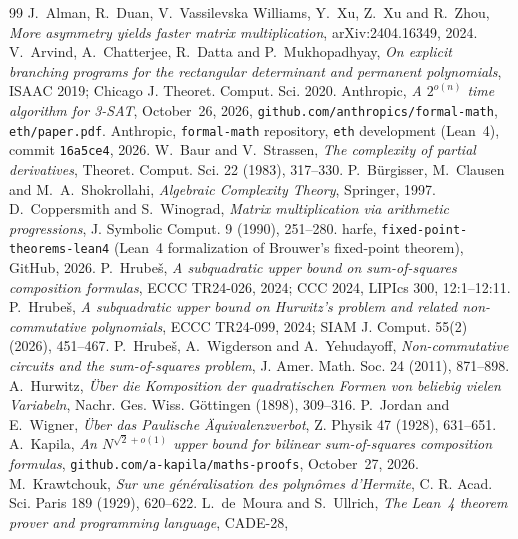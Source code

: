 \documentclass[11pt]{article}
\theoremstyle{definition}
\theoremstyle{remark}
\begin{document}
\begin{thebibliography}{99}
 J.~Alman, R.~Duan, V.~Vassilevska Williams, Y.~Xu, Z.~Xu and R.~Zhou, \emph{More asymmetry
yields faster matrix multiplication}, arXiv:2404.16349, 2024.
 V.~Arvind, A.~Chatterjee, R.~Datta and P.~Mukhopadhyay, \emph{On explicit branching programs
for the rectangular determinant and permanent polynomials}, ISAAC 2019; Chicago J. Theoret. Comput. Sci. 2020.
 Anthropic, \emph{A $2^{o(n)}$ time algorithm for 3-SAT}, October~26, 2026,
\texttt{github.com/anthropics/formal-math}, \texttt{eth/paper.pdf}.
 Anthropic, \texttt{formal-math} repository, \texttt{eth} development (Lean~4),
commit \texttt{16a5ce4}, 2026.
 W.~Baur and V.~Strassen, \emph{The complexity of partial derivatives}, Theoret.
Comput. Sci. 22 (1983), 317--330.
 P.~B\"urgisser, M.~Clausen and M.~A.~Shokrollahi, \emph{Algebraic Complexity Theory}, Springer,
1997.
 D.~Coppersmith and S.~Winograd, \emph{Matrix multiplication via arithmetic
progressions}, J. Symbolic Comput. 9 (1990), 251--280.
 harfe, \texttt{fixed-point-theorems-lean4} (Lean~4 formalization of Brouwer's fixed-point
theorem), GitHub, 2026.
 P.~Hrube\v{s}, \emph{A subquadratic upper bound on sum-of-squares composition formulas},
ECCC TR24-026, 2024; CCC 2024, LIPIcs 300, 12:1--12:11.
 P.~Hrube\v{s}, \emph{A subquadratic upper bound on Hurwitz's problem and related
non-commutative polynomials}, ECCC TR24-099, 2024; SIAM J. Comput. 55(2) (2026), 451--467.
 P.~Hrube\v{s}, A.~Wigderson and A.~Yehudayoff, \emph{Non-commutative circuits and the
sum-of-squares problem}, J. Amer. Math. Soc. 24 (2011), 871--898.
 A.~Hurwitz, \emph{\"Uber die Komposition der quadratischen Formen von beliebig vielen
Variabeln}, Nachr. Ges. Wiss. G\"ottingen (1898), 309--316.
 P.~Jordan and E.~Wigner, \emph{\"Uber das Paulische \"Aquivalenzverbot}, Z. Physik 47
(1928), 631--651.
 A.~Kapila, \emph{An $N^{\sqrt2+o(1)}$ upper bound for bilinear sum-of-squares composition
formulas}, \texttt{github.com/a-kapila/maths-proofs}, October~27, 2026.
 M.~Krawtchouk, \emph{Sur une g\'en\'eralisation des polyn\^omes d'Hermite}, C. R. Acad.
Sci. Paris 189 (1929), 620--622.
 L.~de~Moura and S.~Ullrich, \emph{The Lean~4 theorem prover and programming language}, CADE-28,

\end{thebibliography}
\end{document}
